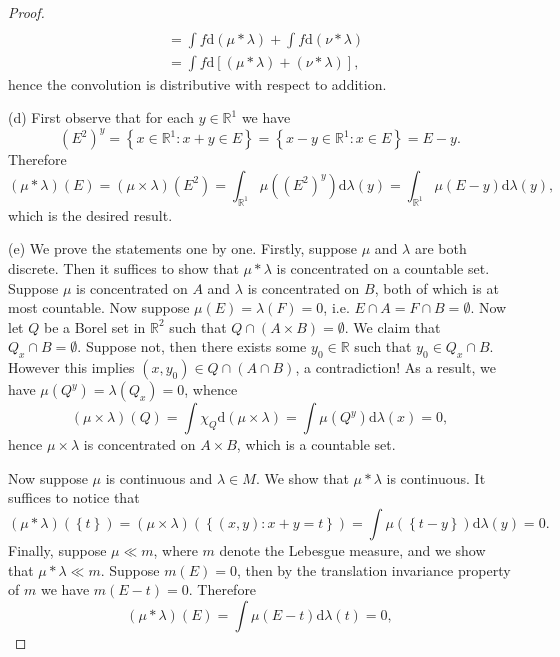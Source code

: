 \begin{proof}
$$\begin{aligned}
\\
&=\int{f\mathrm{d}\left( \mu *\lambda \right)}+\int{f\mathrm{d}\left( \nu *\lambda \right)}
\\
&=\int{f\mathrm{d}\left[ \left( \mu *\lambda \right) +\left( \nu *\lambda \right) \right]},
\end{aligned}
$$
hence the convolution is distributive with respect to addition.\par
(d) First observe that for each $y\in\mathbb{R}^1$ we have 
$$
\left( E^2 \right) ^y=\left\{ x\in \mathbb{R} ^1:x+y\in E \right\} =\left\{ x-y\in \mathbb{R} ^1:x\in E \right\} =E-y.
$$
Therefore 
$$
\left( \mu *\lambda \right) \left( E \right) =\left( \mu \times \lambda \right) \left( E^2 \right) =\int_{\mathbb{R} ^1}{\mu \left( \left( E^2 \right) ^y \right) \mathrm{d}\lambda \left( y \right)}=\int_{\mathbb{R} ^1}{\mu \left( E-y \right) \mathrm{d}\lambda \left( y \right)},
$$
which is the desired result.\par
(e) We prove the statements one by one. Firstly, suppose $\mu$ and $\lambda$ are both discrete. Then it suffices to show that $\mu*\lambda$ is concentrated on a countable set. Suppose $\mu$ is concentrated on $A$ and $\lambda$ is concentrated on $B$, both of which is at most countable. Now suppose $\mu(E)=\lambda(F)=0$, i.e. $E\cap A=F\cap B=\emptyset$. Now let $Q$ be a Borel set in $\mathbb{R}^2$ such that $Q\cap(A\times B)=\emptyset$. We claim that $Q_x\cap B=\emptyset$. Suppose not, then there exists some $y_0\in\mathbb{R}$ such that $y_0\in Q_x\cap B$. However this implies $(x,y_0)\in Q\cap(A\cap B)$, a contradiction! As a result, we have $\mu(Q^y)=\lambda(Q_x)=0$, whence 
$$
\left( \mu \times \lambda \right) \left( Q \right) =\int{\chi _Q\mathrm{d}\left( \mu \times \lambda \right)}=\int{\mu \left( Q^y \right) \mathrm{d}\lambda \left( x \right)}=0,
$$
hence $\mu\times\lambda$ is concentrated on $A\times B$, which is a countable set.\par
Now suppose $\mu$ is continuous and $\lambda\in M$. We show that $\mu*\lambda$ is continuous. It suffices to notice that 
$$
\left( \mu *\lambda \right) \left( \left\{ t \right\} \right) =\left( \mu \times \lambda \right) \left( \left\{ \left( x,y \right) :x+y=t \right\} \right) =\int{\mu \left( \left\{ t-y \right\} \right) \mathrm{d}\lambda \left( y \right)}=0.
$$
Finally, suppose $\mu\ll m$, where $m$ denote the Lebesgue measure, and we show that $\mu*\lambda\ll m$. Suppose $m(E)=0$, then by the translation invariance property of $m$ we have $m(E-t)=0$. Therefore 
$$
\left( \mu *\lambda \right) \left( E \right) =\int{\mu \left( E-t \right) \mathrm{d}\lambda \left( t \right)}=0,
$$
\end{proof}
